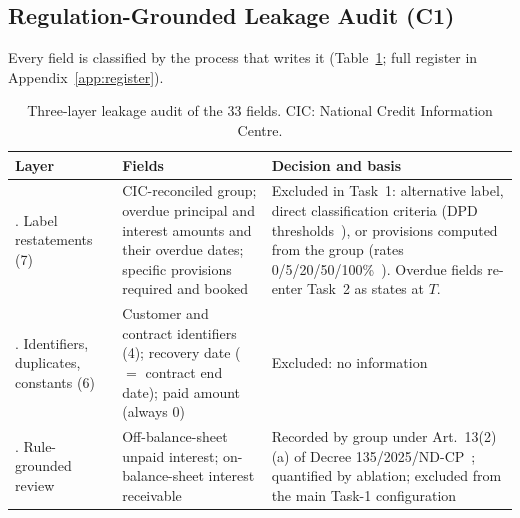 \documentclass[runningheads]{llncs}
\begin{document}
\subsection{Regulation-Grounded Leakage Audit (C1)}
\label{sec:leak}

Every field is classified by the process that writes it (Table~\ref{tab:audit}; full register in Appendix~\ref{app:register}).

\begin{table}[t]
\centering
\caption{Three-layer leakage audit of the 33 fields. CIC: National Credit Information Centre.}
\label{tab:audit}
\scriptsize
\begin{tabular}{@{}>{\raggedright\arraybackslash}p{1.9cm}>{\raggedright\arraybackslash}p{4.3cm}>{\raggedright\arraybackslash}p{5.4cm}@{}}
\toprule
Layer & Fields & Decision and basis\\
\midrule
1. Label restatements (7) & CIC-reconciled group; overdue principal and interest amounts and their overdue dates; specific provisions required and booked & Excluded in Task~1: alternative label, direct classification criteria (DPD thresholds~\cite{sbv2024tt31}), or provisions computed from the group (rates 0/5/20/50/100\%~\cite{gov2024nd86}). Overdue fields re-enter Task~2 as states at $T$.\\
2. Identifiers, duplicates, constants (6) & Customer and contract identifiers (4); recovery date ($=$ contract end date); paid amount (always 0) & Excluded: no information\\
3. Rule-grounded review & Off-balance-sheet unpaid interest; on-balance-sheet interest receivable & Recorded by group under Art.~13(2)(a) of Decree 135/2025/ND-CP~\cite{gov2025nd135}; quantified by ablation; excluded from the main Task-1 configuration\\
\bottomrule
\end{tabular}
\end{table}
\end{document}
